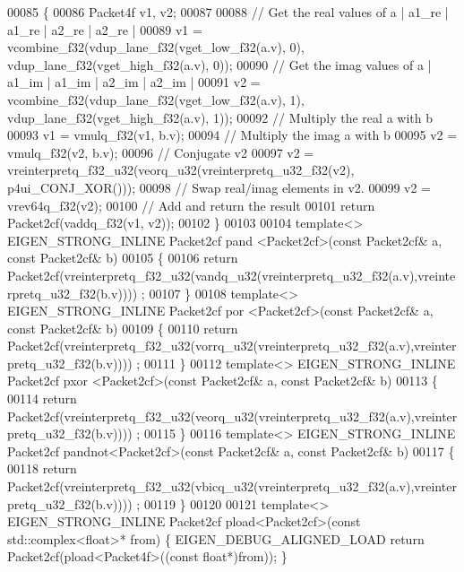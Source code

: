 \begin{DoxyCode}
00085 \{
00086   Packet4f v1, v2;
00087 
00088   \textcolor{comment}{// Get the real values of a | a1\_re | a1\_re | a2\_re | a2\_re |}
00089   v1 = vcombine\_f32(vdup\_lane\_f32(vget\_low\_f32(a.v), 0), vdup\_lane\_f32(vget\_high\_f32(a.v), 0));
00090   \textcolor{comment}{// Get the imag values of a | a1\_im | a1\_im | a2\_im | a2\_im |}
00091   v2 = vcombine\_f32(vdup\_lane\_f32(vget\_low\_f32(a.v), 1), vdup\_lane\_f32(vget\_high\_f32(a.v), 1));
00092   \textcolor{comment}{// Multiply the real a with b}
00093   v1 = vmulq\_f32(v1, b.v);
00094   \textcolor{comment}{// Multiply the imag a with b}
00095   v2 = vmulq\_f32(v2, b.v);
00096   \textcolor{comment}{// Conjugate v2 }
00097   v2 = vreinterpretq\_f32\_u32(veorq\_u32(vreinterpretq\_u32\_f32(v2), p4ui\_CONJ\_XOR()));
00098   \textcolor{comment}{// Swap real/imag elements in v2.}
00099   v2 = vrev64q\_f32(v2);
00100   \textcolor{comment}{// Add and return the result}
00101   \textcolor{keywordflow}{return} Packet2cf(vaddq\_f32(v1, v2));
00102 \}
00103 
00104 \textcolor{keyword}{template}<> EIGEN\_STRONG\_INLINE Packet2cf pand   <Packet2cf>(\textcolor{keyword}{const} Packet2cf& a, \textcolor{keyword}{const} Packet2cf& b)
00105 \{
00106   \textcolor{keywordflow}{return} Packet2cf(vreinterpretq\_f32\_u32(vandq\_u32(vreinterpretq\_u32\_f32(a.v),vreinterpretq\_u32\_f32(b.v))))
      ;
00107 \}
00108 \textcolor{keyword}{template}<> EIGEN\_STRONG\_INLINE Packet2cf por    <Packet2cf>(\textcolor{keyword}{const} Packet2cf& a, \textcolor{keyword}{const} Packet2cf& b)
00109 \{
00110   \textcolor{keywordflow}{return} Packet2cf(vreinterpretq\_f32\_u32(vorrq\_u32(vreinterpretq\_u32\_f32(a.v),vreinterpretq\_u32\_f32(b.v))))
      ;
00111 \}
00112 \textcolor{keyword}{template}<> EIGEN\_STRONG\_INLINE Packet2cf pxor   <Packet2cf>(\textcolor{keyword}{const} Packet2cf& a, \textcolor{keyword}{const} Packet2cf& b)
00113 \{
00114   \textcolor{keywordflow}{return} Packet2cf(vreinterpretq\_f32\_u32(veorq\_u32(vreinterpretq\_u32\_f32(a.v),vreinterpretq\_u32\_f32(b.v))))
      ;
00115 \}
00116 \textcolor{keyword}{template}<> EIGEN\_STRONG\_INLINE Packet2cf pandnot<Packet2cf>(\textcolor{keyword}{const} Packet2cf& a, \textcolor{keyword}{const} Packet2cf& b)
00117 \{
00118   \textcolor{keywordflow}{return} Packet2cf(vreinterpretq\_f32\_u32(vbicq\_u32(vreinterpretq\_u32\_f32(a.v),vreinterpretq\_u32\_f32(b.v))))
      ;
00119 \}
00120 
00121 \textcolor{keyword}{template}<> EIGEN\_STRONG\_INLINE Packet2cf pload<Packet2cf>(\textcolor{keyword}{const} std::complex<float>* from) \{ 
      EIGEN\_DEBUG\_ALIGNED\_LOAD \textcolor{keywordflow}{return} Packet2cf(pload<Packet4f>((\textcolor{keyword}{const} \textcolor{keywordtype}{float}*)from)); \}

\end{DoxyCode}

